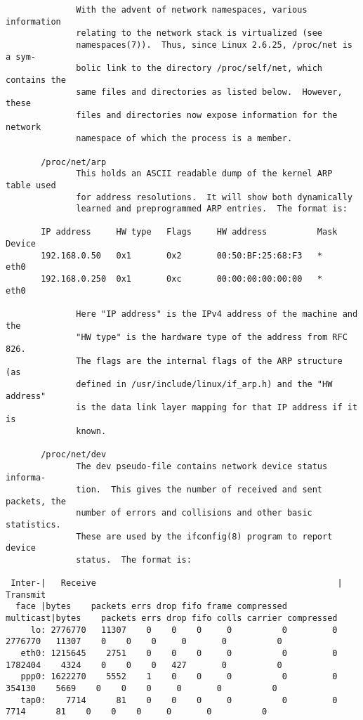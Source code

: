 \documentclass[]{article}
\begin{document}
\begin{verbatim}
              With the advent of network namespaces, various information
              relating to the network stack is virtualized (see
              namespaces(7)).  Thus, since Linux 2.6.25, /proc/net is a sym‐
              bolic link to the directory /proc/self/net, which contains the
              same files and directories as listed below.  However, these
              files and directories now expose information for the network
              namespace of which the process is a member.

       /proc/net/arp
              This holds an ASCII readable dump of the kernel ARP table used
              for address resolutions.  It will show both dynamically
              learned and preprogrammed ARP entries.  The format is:

       IP address     HW type   Flags     HW address          Mask   Device
       192.168.0.50   0x1       0x2       00:50:BF:25:68:F3   *      eth0
       192.168.0.250  0x1       0xc       00:00:00:00:00:00   *      eth0

              Here "IP address" is the IPv4 address of the machine and the
              "HW type" is the hardware type of the address from RFC 826.
              The flags are the internal flags of the ARP structure (as
              defined in /usr/include/linux/if_arp.h) and the "HW address"
              is the data link layer mapping for that IP address if it is
              known.

       /proc/net/dev
              The dev pseudo-file contains network device status informa‐
              tion.  This gives the number of received and sent packets, the
              number of errors and collisions and other basic statistics.
              These are used by the ifconfig(8) program to report device
              status.  The format is:

 Inter-|   Receive                                                |  Transmit
  face |bytes    packets errs drop fifo frame compressed multicast|bytes    packets errs drop fifo colls carrier compressed
     lo: 2776770   11307    0    0    0     0          0         0  2776770   11307    0    0    0     0       0          0
   eth0: 1215645    2751    0    0    0     0          0         0  1782404    4324    0    0    0   427       0          0
   ppp0: 1622270    5552    1    0    0     0          0         0   354130    5669    0    0    0     0       0          0
   tap0:    7714      81    0    0    0     0          0         0     7714      81    0    0    0     0       0          0


\end{verbatim}
\end{document}
